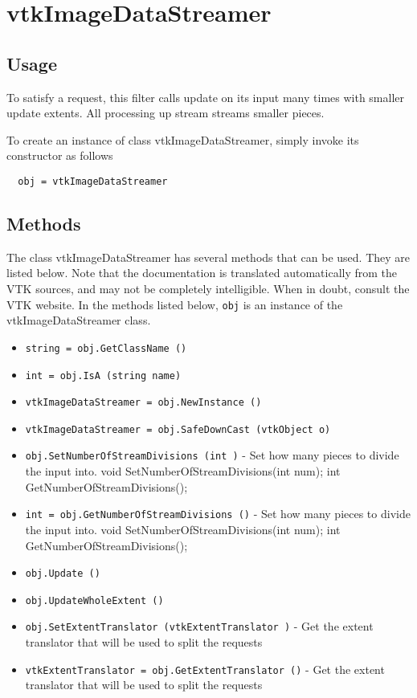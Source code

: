 \section{vtkImageDataStreamer}

\subsection{Usage}

 To satisfy a request, this filter calls update on its input
 many times with smaller update extents.  All processing up stream
 streams smaller pieces.

To create an instance of class vtkImageDataStreamer, simply
invoke its constructor as follows
\begin{verbatim}
  obj = vtkImageDataStreamer
\end{verbatim}
\subsection{Methods}

The class vtkImageDataStreamer has several methods that can be used.
  They are listed below.
Note that the documentation is translated automatically from the VTK sources,
and may not be completely intelligible.  When in doubt, consult the VTK website.
In the methods listed below, \verb|obj| is an instance of the vtkImageDataStreamer class.
\begin{itemize}
\item  \verb|string = obj.GetClassName ()|

\item  \verb|int = obj.IsA (string name)|

\item  \verb|vtkImageDataStreamer = obj.NewInstance ()|

\item  \verb|vtkImageDataStreamer = obj.SafeDownCast (vtkObject o)|

\item  \verb|obj.SetNumberOfStreamDivisions (int )| -  Set how many pieces to divide the input into.
 void SetNumberOfStreamDivisions(int num);
 int GetNumberOfStreamDivisions();

\item  \verb|int = obj.GetNumberOfStreamDivisions ()| -  Set how many pieces to divide the input into.
 void SetNumberOfStreamDivisions(int num);
 int GetNumberOfStreamDivisions();

\item  \verb|obj.Update ()|

\item  \verb|obj.UpdateWholeExtent ()|

\item  \verb|obj.SetExtentTranslator (vtkExtentTranslator )| -  Get the extent translator that will be used to split the requests

\item  \verb|vtkExtentTranslator = obj.GetExtentTranslator ()| -  Get the extent translator that will be used to split the requests

\end{itemize}
